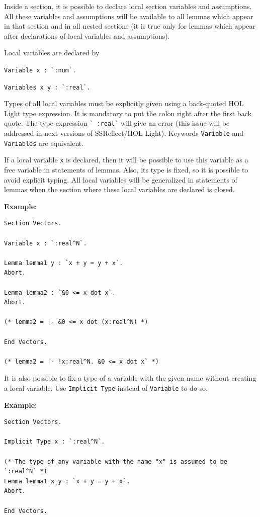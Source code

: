 \documentclass[a4paper]{article}
\begin{document}
Inside a section, it is possible to declare local section variables and assumptions. All these variables and assumptions will be available to all lemmas which appear in that section and in all nested sections (it is true only for lemmas which appear after declarations of local variables and assumptions).

Local variables are declared by

\verb|Variable x : `:num`.|

\verb|Variables x y : `:real`.|

Types of all local variables must be explicitly given using a back-quoted HOL Light type expression. It is mandatory to put the colon right after the first back quote. The type expression \verb|` :real`| will give an error (this issue will be addressed in next versions of SSReflect/HOL Light). Keywords \verb|Variable| and \verb|Variables| are equivalent.

If a local variable \verb|x| is declared, then it will be possible to use this variable as a free variable in statements of lemmas. Also, its type is fixed, so it is possible to avoid explicit typing. All local variables will be generalized in statements of lemmas when the section where these local variables are declared is closed. 

{\bf Example:}
\begin{verbatim}
Section Vectors.

Variable x : `:real^N`.

Lemma lemma1 y : `x + y = y + x`.
Abort.

Lemma lemma2 : `&0 <= x dot x`.
Abort.

(* lemma2 = |- &0 <= x dot (x:real^N) *)

End Vectors.

(* lemma2 = |- !x:real^N. &0 <= x dot x` *)
\end{verbatim}

It is also possible to fix a type of a variable with the given name without creating a local variable. Use \verb|Implicit Type| instead of \verb|Variable| to do so. 

{\bf Example:}
\begin{verbatim}
Section Vectors.

Implicit Type x : `:real^N`.

(* The type of any variable with the name "x" is assumed to be `:real^N` *)
Lemma lemma1 x y : `x + y = y + x`.
Abort.

End Vectors.
\end{verbatim}
\end{document}
